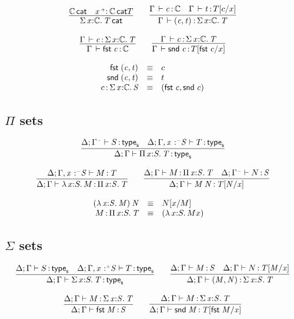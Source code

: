 \documentclass[11pt]{article}
\theoremstyle{plain}
\begin{document}
\[
\begin{array}{c}
\infer{\wfdtp{\sigmacl{x}{\C}{T}}}
      {\wfdtp{\C} &
        \wfdtp{\vtptm{x}{\co}{\C}}{T}}
\qquad
\infer{\ofdtp{\Gamma}{\pair{c}{t}}{\sigmacl x \C T}}
      {\ofdtp{\Gamma}{c}{\C} &
       \ofdtp{\Gamma}{t}{\subst{T}{c}{x}}}
\\ \\
\infer{\ofdtp{\Gamma}{\fst c}{\C}}
      {\ofdtp{\Gamma}{c}{\sigmacl{x}{\C}{T}}}
\qquad
\infer{\ofdtp{\Gamma}{\snd c}{\subst{T}{\fst c}{x}}}
      {\ofdtp{\Gamma}{c}{\sigmacl{x}{\C}{T}}}
\end{array}
\]

\[
\begin{array}{rcll}
\mathit{\mathsf{fst}_{} \: \mathit{(c,t)_{}}} & \equiv & c \\
\mathit{\mathsf{snd}_{} \: \mathit{(c,t)_{}}} & \equiv & t \\
c \, \mathit{:} \, \textnormal{$\Sigma$}\,x \mathit{:} \mathbb{C}.\,\mathit{S} & \equiv & \mathit{(\mathit{\mathsf{fst}_{} \: c},\mathit{\mathsf{snd}_{} \: c})_{}}
\end{array}
\]


\subsection{$\Pi$ sets}

\[
\begin{array}{c}
\infer{\wftpsf{\Delta}{\Gamma}{\picl{x}{S}{T}}}
      {\wftpsf{\Delta}{\Gamma^\con}{S} &
        \wftpsf{\Delta}{\Gamma, \vstptm {x}{\con}{S}}{T}}
\\ \\
\infer{\oftpsf{\Delta}{\Gamma}{\lam{x}{S}{M}}{\picl x S T}}
      {\oftpsf{\Delta}{\Gamma, \vstptm x {\con} S}{M}{T}}
\qquad
\infer{\oftpsf{\Delta}{\Gamma}{\app M N}{\subst T N x}}
      {\oftpsf{\Delta}{\Gamma}{M}{\picl{x}{S}{T}} &
        \oftpsf{\Delta}{\Gamma^\con}{N}{S}}
\end{array}
\]

\[
\begin{array}{rcll}
\mathit{({\lambda\,x \mathit{:} S.\,M}) \: N} & \equiv & N [ x / M ] \\
M \, \mathit{:} \, \textnormal{$\Pi$}\,x \mathit{:} S.\,\mathit{T} & \equiv & {({\lambda\,x \mathit{:} S.\,M}{x})} &
\end{array} \\
\]

\subsection{$\Sigma$ sets}

\[
\begin{array}{c}
\infer{\wftpsf{\Delta}{\Gamma}{\sigmacl{x}{S}{T}}}
      {\wftpsf{\Delta}{\Gamma}{S} &
        \wftpsf{\Delta}{\Gamma, \vstptm{x}{\co}{S}}{T}}
\qquad
\infer{\oftpsf{\Delta}{\Gamma}{\pair{M}{N}}{\sigmacl x S T}}
      {\oftpsf{\Delta}{\Gamma}{M}{S} &
       \oftpsf{\Delta}{\Gamma}{N}{\subst{T}{M}x}}
\\ \\
\infer{\oftpsf{\Delta}{\Gamma}{\fst M}{S}}
      {\oftpsf{\Delta}{\Gamma}{M}{\sigmacl{x}{S}{T}}}
\qquad
\infer{\oftpsf{\Delta}{\Gamma}{\snd M}{\subst{T}{\fst M}{x}}}
      {\oftpsf{\Delta}{\Gamma}{M}{\sigmacl{x}{S}{T}}}
\end{array}
\]
\end{document}
